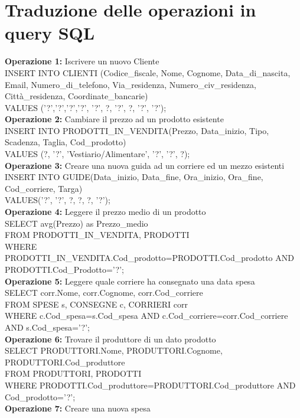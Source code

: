 \documentclass[a4paper,12pt]{report}
\begin{document}
\section{Traduzione delle operazioni in query SQL}
\textbf{Operazione 1:}
Iscrivere un nuovo Cliente\\
INSERT INTO CLIENTI (Codice\_fiscale, Nome, Cognome, Data\_di\_nascita, Email, Numero\_di\_telefono, Via\_residenza, Numero\_civ\_residenza, Città\_residenza, Coordinate\_bancarie)\\
VALUES ('?','?','?','?', '?', ?, '?', ?, '?', '?');\\
\textbf{Operazione 2:}
Cambiare il prezzo ad un prodotto esistente\\
INSERT INTO PRODOTTI\_IN\_VENDITA(Prezzo, Data\_inizio, Tipo, Scadenza, Taglia, Cod\_prodotto)\\
VALUES (?, '?', 'Vestiario/Alimentare', '?', '?', ?);\\
\textbf{Operazione 3:}
Creare una nuova guida ad un corriere ed un mezzo esistenti\\
INSERT INTO GUIDE(Data\_inizio, Data\_fine, Ora\_inizio, Ora\_fine, Cod\_corriere, Targa)\\
VALUES('?', '?', ?, ?, ?, '?');\\
\textbf{Operazione 4:}
Leggere il prezzo medio di un prodotto\\
SELECT avg(Prezzo) as Prezzo\_medio\\
FROM PRODOTTI\_IN\_VENDITA, PRODOTTI\\
WHERE PRODOTTI\_IN\_VENDITA.Cod\_prodotto=PRODOTTI.Cod\_prodotto AND PRODOTTI.Cod\_Prodotto='?';\\
\textbf{Operazione 5:}
Leggere quale corriere ha consegnato una data spesa\\
SELECT corr.Nome, corr.Cognome, corr.Cod\_corriere\\
FROM SPESE s, CONSEGNE c, CORRIERI corr\\
WHERE c.Cod\_spesa=s.Cod\_spesa AND c.Cod\_corriere=corr.Cod\_corriere AND s.Cod\_spesa='?';\\
\textbf{Operazione 6:}
Trovare il produttore di un dato prodotto\\
SELECT PRODUTTORI.Nome, PRODUTTORI.Cognome, PRODUTTORI.Cod\_produttore\\
FROM PRODUTTORI, PRODOTTI\\
WHERE PRODOTTI.Cod\_produttore=PRODUTTORI.Cod\_produttore AND Cod\_prodotto='?';\\
\textbf{Operazione 7:}
Creare una nuova spesa\\
\end{document}
